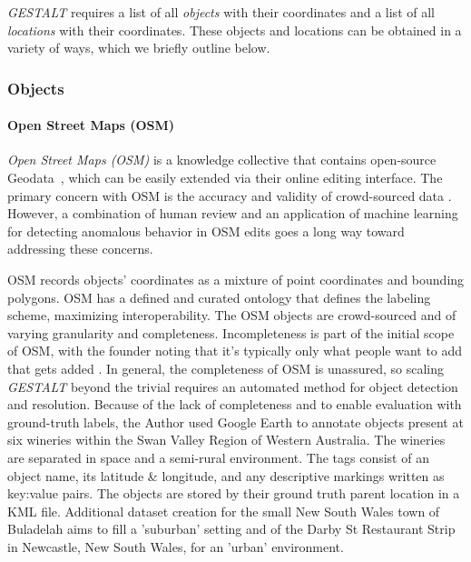 \emph{GESTALT} requires a list of all \textit{objects} with their coordinates and a list of all \textit{locations} with their coordinates. These objects and locations can be obtained in a variety of ways, which we briefly outline below. 

\subsubsection{Objects}
\paragraph{Open Street Maps (OSM)}
\textit{Open Street Maps (OSM)} is a knowledge collective that contains open-source Geodata~\cite{Haklay2008}, which can be easily extended via their online editing interface.
The primary concern with OSM is the accuracy and validity of crowd-sourced data \cite{VargasMunoz2020}. However, a combination of human review and an application of machine learning for detecting anomalous behavior in OSM edits \cite{Mooney2017} goes a long way toward addressing these concerns. 

OSM records objects' coordinates as a mixture of point coordinates and bounding polygons. 
OSM has a defined and curated ontology that defines the labeling scheme, maximizing interoperability. 
The OSM objects are crowd-sourced and of varying granularity and completeness. Incompleteness is part of the initial scope of OSM, with the founder noting that it's typically only what people want to add that gets added \cite{Haklay2008}.
In general, the completeness of OSM is unassured, so scaling \textit{GESTALT} beyond the trivial requires an automated method for object detection and resolution. 
Because of the lack of completeness and to enable evaluation with ground-truth labels, the Author used Google Earth to annotate objects present at six wineries within the Swan Valley Region of Western Australia. The wineries are separated in space and a semi-rural environment. The tags consist of an object name, its latitude \& longitude, and any descriptive markings written as key:value pairs. The objects are stored by their ground truth parent location in a KML file. Additional dataset creation for the small New South Wales town of Buladelah aims to fill a 'suburban' setting and of the Darby St Restaurant Strip in Newcastle, New South Wales, for an 'urban' environment. 

